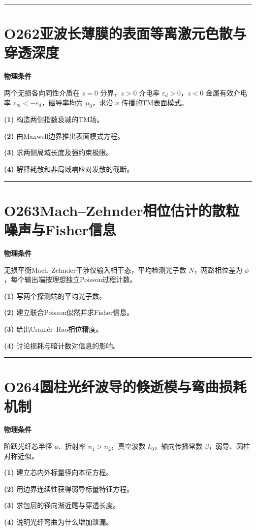 \documentclass[UTF8,a4paper,11pt,oneside,openany]{ctexbook}
\begin{document}
\par\bigskip\hrule\bigskip
\section*{O262\quad 亚波长薄膜的表面等离激元色散与穿透深度}
\textbf{物理条件}\par 两个无损各向同性介质在 \(z=0\) 分界，\(z>0\) 介电率 \(\varepsilon_d>0\)，\(z<0\) 金属有效介电率 \(\varepsilon_m<-\varepsilon_d\)，磁导率均为 \(\mu_0\)，求沿 \(x\) 传播的TM表面模式。
\par\noindent\textbf{(1)} 构造两侧指数衰减的TM场。
\par\noindent\textbf{(2)} 由Maxwell边界推出表面模式方程。
\par\noindent\textbf{(3)} 求两侧局域长度及强约束极限。
\par\noindent\textbf{(4)} 解释耗散和非局域响应对发散的截断。

\par\bigskip\hrule\bigskip
\section*{O263\quad Mach–Zehnder相位估计的散粒噪声与Fisher信息}
\textbf{物理条件}\par 无损平衡Mach–Zehnder干涉仪输入相干态，平均检测光子数 \(N\)，两路相位差为 \(\phi\)，每个输出端按理想独立Poisson过程计数。
\par\noindent\textbf{(1)} 写两个探测端的平均光子数。
\par\noindent\textbf{(2)} 建立联合Poisson似然并求Fisher信息。
\par\noindent\textbf{(3)} 给出Cramér–Rao相位精度。
\par\noindent\textbf{(4)} 讨论损耗与暗计数对信息的影响。

\par\bigskip\hrule\bigskip
\section*{O264\quad 圆柱光纤波导的倏逝模与弯曲损耗机制}
\textbf{物理条件}\par 阶跃光纤芯半径 \(a\)、折射率 \(n_1>n_2\)，真空波数 \(k_0\)，轴向传播常数 \(\beta\)，弱导、圆柱对称近似。
\par\noindent\textbf{(1)} 建立芯内外标量径向本征方程。
\par\noindent\textbf{(2)} 用边界连续性获得弱导标量特征方程。
\par\noindent\textbf{(3)} 求包层的径向渐近尾与穿透长度。
\par\noindent\textbf{(4)} 说明光纤弯曲为什么增加泄漏。
\end{document}
